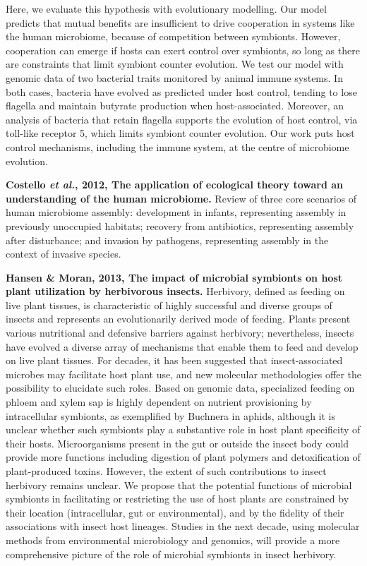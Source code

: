 \documentclass[11pt]{article}
\begin{document}
\begin{sloppypar}
Here, we evaluate this hypothesis with evolutionary modelling. 
Our model predicts that mutual benefits are insufficient to drive cooperation in systems like the human microbiome, because of competition between symbionts. 
However, cooperation can emerge if hosts can exert control over symbionts, so long as there are constraints that limit symbiont counter evolution. 
We test our model with genomic data of two bacterial traits monitored by animal immune systems. 
In both cases, bacteria have evolved as predicted under host control, tending to lose flagella and maintain butyrate production when host-associated. 
Moreover, an analysis of bacteria that retain flagella supports the evolution of host control, via toll-like receptor 5, which limits symbiont counter evolution. 
Our work puts host control mechanisms, including the immune system, at the centre of microbiome evolution. 
\par
\textbf{Costello \textit{et al.}, 2012, The application of ecological theory toward an understanding of the human microbiome.} \newline
Review of three core scenarios of human microbiome assembly: 
development in infants, representing assembly in previously unoccupied habitats; 
recovery from antibiotics, representing assembly after disturbance; 
and invasion by pathogens, representing assembly in the context of invasive species. 
\par
\textbf{Hansen & Moran, 2013, The impact of microbial symbionts on host plant utilization by herbivorous insects.} \newline
Herbivory, defined as feeding on live plant tissues, is characteristic of highly successful and diverse groups of insects and represents an evolutionarily derived mode of feeding. Plants present various nutritional and defensive barriers against herbivory; nevertheless, insects have evolved a diverse array of mechanisms that enable them to feed and develop on live plant tissues. For decades, it has been suggested that insect-associated microbes may facilitate host plant use, and new molecular methodologies offer the possibility to elucidate such roles. Based on genomic data, specialized feeding on phloem and xylem sap is highly dependent on nutrient provisioning by intracellular symbionts, as exemplified by Buchnera in aphids, although it is unclear whether such symbionts play a substantive role in host plant specificity of their hosts. Microorganisms present in the gut or outside the insect body could provide more functions including digestion of plant polymers and detoxification of plant-produced toxins. However, the extent of such contributions to insect herbivory remains unclear. We propose that the potential functions of microbial symbionts in facilitating or restricting the use of host plants are constrained by their location (intracellular, gut or environmental), and by the fidelity of their associations with insect host lineages. Studies in the next decade, using molecular methods from environmental microbiology and genomics, will provide a more comprehensive picture of the role of microbial symbionts in insect herbivory.

\end{sloppypar}
\end{document}
